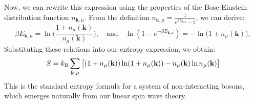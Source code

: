 \documentclass[aps, prx, nofootinbib, superscriptaddress]{revtex4-2}
\newcommand{\kvec}{\mathbf{k}}
\begin{document}
Now, we can rewrite this expression using the properties of the Bose-Einstein distribution function $n_{\kvec, \mu}$. From the definition $n_{\kvec, \mu} = \frac{1}{e^{\beta E_{\kvec, \mu}} - 1}$, we can derive:
\begin{equation}
    \beta E_{\kvec, \mu} = \ln \Big( \frac{1 + n_{\mu}(\kvec)}{n_{\mu}(\kvec)} \Big), 
    \quad \text{and} \quad
    \ln \left( 1 - e^{-\beta E_{\kvec, \mu}} \right) 
    = -\ln \big( 1 + n_{\mu} (\kvec) \big), 
\end{equation}
Substituting these relations into our entropy expression, we obtain:
\begin{equation}
    S = k_{\rm B} \sum_{\kvec, \mu} \big[ (1 + n_{\mu}(\kvec)) \ln (1 + n_{\mu}(\kvec)) - n_{\mu}(\kvec) \ln n_{\mu} (\kvec) \big]
\end{equation}
This is the standard entropy formula for a system of non-interacting bosons, which emerges naturally from our linear spin wave theory.
\end{document}
